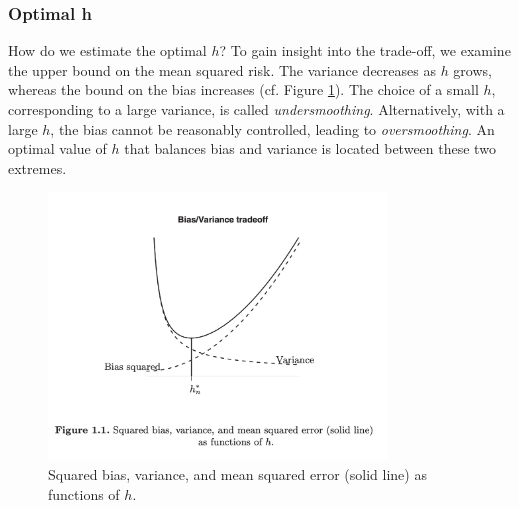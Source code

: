 \documentclass{article}
\begin{document}
\subsubsection{Optimal h}


How do we estimate the optimal $h$? To gain insight into the trade-off, we examine the upper bound on the mean squared risk. The variance decreases as $h$ grows, whereas the bound on the bias increases (cf. Figure \ref{fig:tradeoff}). The choice of a small $h$, corresponding to a large variance, is called \textit{undersmoothing}. Alternatively, with a large $h$, the bias cannot be reasonably controlled, leading to \textit{oversmoothing}. An optimal value of $h$ that balances bias and variance is located between these two extremes.

\begin{figure}[h]
    \centering
    \includegraphics[width=0.8\textwidth]{trade_off_nonparametrics.png} %
    \caption{Squared bias, variance, and mean squared error (solid line) as functions of $h$.}
    \label{fig:tradeoff}
\end{figure}
\end{document}
